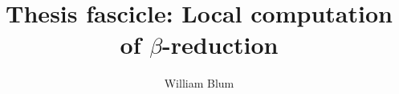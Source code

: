 

\author{William Blum}
\title{Thesis fascicle: Local computation of $\beta$-reduction}


    \maketitle
    \tableofcontents

    

    
    


